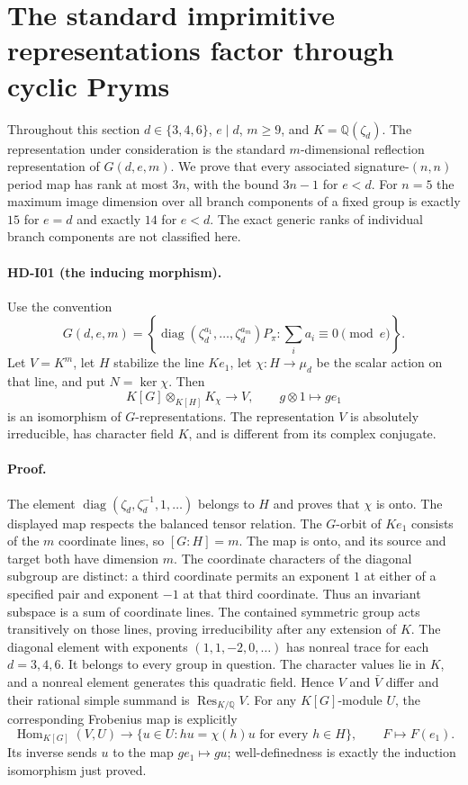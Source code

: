 \section{The standard imprimitive representations factor through cyclic Pryms}
\label{sec:HD-I}

Throughout this section $d\in\{3,4,6\}$, $e\mid d$, $m\ge9$, and
$K=\mathbb Q(\zeta_d)$. The representation under consideration is the
standard $m$-dimensional reflection representation of $G(d,e,m)$.
We prove that every associated signature-$(n,n)$ period map has rank at
most $3n$, with the bound $3n-1$ for $e<d$. For $n=5$ the maximum image
dimension over all branch components of a fixed group is exactly $15$
for $e=d$ and exactly $14$ for $e<d$. The exact generic ranks of individual
branch components are not classified here.

\paragraph{HD-I01 (the inducing morphism).}
Use the convention
\[
G(d,e,m)=\left\{\operatorname{diag}(\zeta_d^{a_1},\ldots,
\zeta_d^{a_m})P_\pi:\sum_i a_i\equiv0\pmod e\right\}.
\]
Let $V=K^m$, let $H$ stabilize the line $Ke_1$, let
$\chi:H\to\mu_d$ be the scalar action on that line, and put
$N=\ker\chi$. Then
\[
K[G]\otimes_{K[H]}K_\chi\longrightarrow V,
\qquad g\otimes1\longmapsto ge_1
\]
is an isomorphism of $G$-representations. The representation $V$ is
absolutely irreducible, has character field $K$, and is different from
its complex conjugate.

\paragraph{Proof.}
The element $\operatorname{diag}(\zeta_d,\zeta_d^{-1},1,\ldots)$
belongs to $H$ and proves that $\chi$ is onto. The displayed map respects
the balanced tensor relation. The $G$-orbit of $Ke_1$ consists of the
$m$ coordinate lines, so $[G:H]=m$. The map is onto, and its source and
target both have dimension $m$.
The coordinate characters of the diagonal subgroup are distinct: a
third coordinate permits an exponent $1$ at either of a specified pair
and exponent $-1$ at that third coordinate. Thus an invariant subspace
is a sum of coordinate lines. The contained symmetric group acts
transitively on those lines, proving irreducibility after any extension
of $K$. The diagonal element with exponents $(1,1,-2,0,\ldots)$ has
nonreal trace for each $d=3,4,6$. It belongs to every group in question.
The character values lie in $K$, and a nonreal element generates this
quadratic field. Hence $V$ and $\bar V$ differ and their rational simple
summand is $\operatorname{Res}_{K/\mathbb Q}V$.
For any $K[G]$-module $U$, the corresponding Frobenius map is explicitly
\[
\operatorname{Hom}_{K[G]}(V,U)
\longrightarrow\{u\in U:hu=\chi(h)u\text{ for every }h\in H\},
\qquad F\longmapsto F(e_1).
\]
Its inverse sends $u$ to the map $ge_1\mapsto gu$; well-definedness is
exactly the induction isomorphism just proved.

